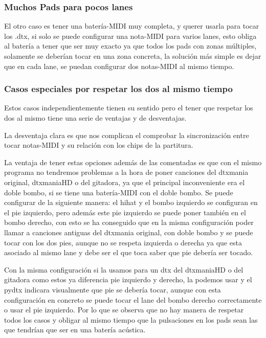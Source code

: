 \documentclass[a4paper,11pt,oneside]{book}
\begin{document}
\subsubsection{Muchos Pads para pocos lanes}

El otro caso es tener una batería-MIDI muy completa, y querer usarla para tocar los .dtx, si solo se puede configurar una nota-MIDI para varios lanes, esto obliga al batería a tener que ser muy exacto ya que todos los pads con zonas múltiples, solamente se deberían tocar en una zona concreta, la solución más simple es dejar que en cada lane, se puedan configurar dos notas-MIDI al mismo tiempo.

\subsubsection{Casos especiales por respetar los dos al mismo tiempo}

Estos casos independientemente tienen su sentido pero el tener que respetar los dos al mismo tiene una serie de ventajas y de desventajas.

La desventaja clara es que nos complican el comprobar la sincronización entre tocar notas-MIDI y su relación con los chips de la partitura.

La ventaja de tener estas opciones además de las comentadas es que con el mismo programa no tendremos problemas a la hora de poner canciones del dtxmania original, dtxmaniaHD o del gitadora, ya que el principal inconveniente era el doble bombo, si se tiene una batería-MIDI con el doble bombo. 
Se puede configurar de la siguiente manera: el hihat y el bombo izquierdo se configuran en el pie izquierdo, pero además este pie izquierdo se puede poner también en el bombo derecho, con esto se ha conseguido que en la misma configuración poder llamar a canciones antiguas del dtxmania original, con doble bombo y se puede tocar con los dos pies, aunque no se respeta izquierda o derecha ya que esta asociado al mismo lane y debe ser el que toca saber que pie debería ser tocado. 

Con la misma configuración si la usamos para un dtx del dtxmaniaHD o del gitadora como estos ya diferencia pie izquierdo y derecho, la podemos usar y el pydtx indicara visualmente que pie se debería tocar, aunque con esta configuración en concreto se puede tocar el lane del bombo derecho correctamente o usar el pie izquierdo. Por lo que se observa que no hay manera de respetar todos los casos y obligar al mismo tiempo que la pulsaciones en los pads sean las que tendrían que ser en una batería acústica.
\end{document}
